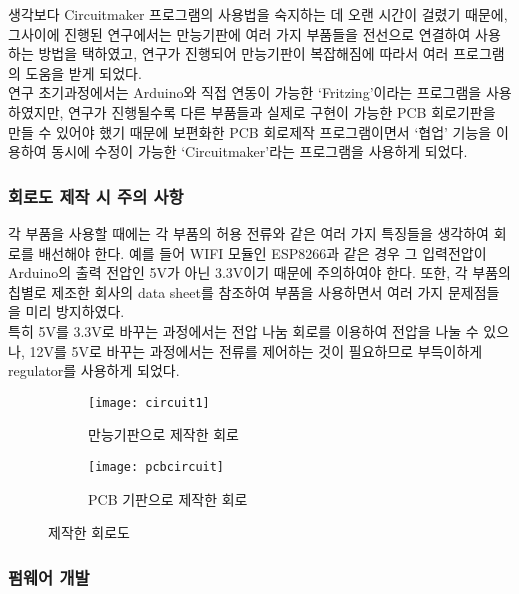 생각보다 Circuitmaker 프로그램의 사용법을 숙지하는 데 오랜 시간이 걸렸기 때문에, 그사이에 진행된 연구에서는 만능기판에 여러 가지 부품들을 전선으로 연결하여 사용하는 방법을 택하였고, 연구가 진행되어 만능기판이 복잡해짐에 따라서 여러 프로그램의 도움을 받게 되었다.\\

연구 초기과정에서는 Arduino와 직접 연동이 가능한 ‘Fritzing’이라는 프로그램을 사용하였지만, 연구가 진행될수록 다른 부품들과 실제로 구현이 가능한 PCB 회로기판을 만들 수 있어야 했기 때문에 보편화한 PCB 회로제작 프로그램이면서 ‘협업’ 기능을 이용하여 동시에 수정이 가능한 ‘Circuitmaker’라는 프로그램을 사용하게 되었다.

\subsubsection{회로도 제작 시 주의 사항}

각 부품을 사용할 때에는 각 부품의 허용 전류와 같은 여러 가지 특징들을 생각하여 회로를 배선해야 한다. 예를 들어 WIFI 모듈인 ESP8266과 같은 경우 그 입력전압이 Arduino의 출력 전압인 5V가 아닌 3.3V이기 때문에 주의하여야 한다. 또한, 각 부품의 칩별로 제조한 회사의 data sheet를 참조하여 부품을 사용하면서 여러 가지 문제점들을 미리 방지하였다.\\
특히 5V를 3.3V로 바꾸는 과정에서는 전압 나눔 회로를 이용하여 전압을 나눌 수 있으나, 12V를 5V로 바꾸는 과정에서는 전류를 제어하는 것이 필요하므로 부득이하게 regulator를 사용하게 되었다.
\begin{figure}[ht]
	\begin{subfigure}{0.5\textwidth}
		\texttt{[image: circuit1]} 
		\caption{만능기판으로 제작한 회로}
		\label{fig:circuit1}
	\end{subfigure}
	\begin{subfigure}{0.5\textwidth}
		\texttt{[image: pcbcircuit]}
		\caption{PCB 기판으로 제작한 회로}
		\label{fig:pcbcircuit}
	\end{subfigure}
	\caption{제작한 회로도}
	\label{fig:image2}
\end{figure}

\subsubsection{펌웨어 개발}

